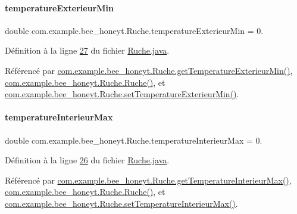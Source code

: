 \paragraph{\texorpdfstring{temperature\+Exterieur\+Min}{temperatureExterieurMin}}
{\footnotesize\ttfamily double com.\+example.\+bee\+\_\+honeyt.\+Ruche.\+temperature\+Exterieur\+Min = 0.\hspace{0.3cm}{\ttfamily [private]}}



Définition à la ligne \hyperlink{_ruche_8java_source_l00027}{27} du fichier \hyperlink{_ruche_8java_source}{Ruche.\+java}.



Référencé par \hyperlink{_ruche_8java_source_l00149}{com.\+example.\+bee\+\_\+honeyt.\+Ruche.\+get\+Temperature\+Exterieur\+Min()}, \hyperlink{_ruche_8java_source_l00044}{com.\+example.\+bee\+\_\+honeyt.\+Ruche.\+Ruche()}, et \hyperlink{_ruche_8java_source_l00154}{com.\+example.\+bee\+\_\+honeyt.\+Ruche.\+set\+Temperature\+Exterieur\+Min()}.

\mbox{\label{classcom_1_1example_1_1bee__honeyt_1_1_ruche_af2d8d214dabc9af08329aa3173047245}} 
\paragraph{\texorpdfstring{temperature\+Interieur\+Max}{temperatureInterieurMax}}
{\footnotesize\ttfamily double com.\+example.\+bee\+\_\+honeyt.\+Ruche.\+temperature\+Interieur\+Max = 0.\hspace{0.3cm}{\ttfamily [private]}}



Définition à la ligne \hyperlink{_ruche_8java_source_l00026}{26} du fichier \hyperlink{_ruche_8java_source}{Ruche.\+java}.



Référencé par \hyperlink{_ruche_8java_source_l00139}{com.\+example.\+bee\+\_\+honeyt.\+Ruche.\+get\+Temperature\+Interieur\+Max()}, \hyperlink{_ruche_8java_source_l00044}{com.\+example.\+bee\+\_\+honeyt.\+Ruche.\+Ruche()}, et \hyperlink{_ruche_8java_source_l00144}{com.\+example.\+bee\+\_\+honeyt.\+Ruche.\+set\+Temperature\+Interieur\+Max()}.

